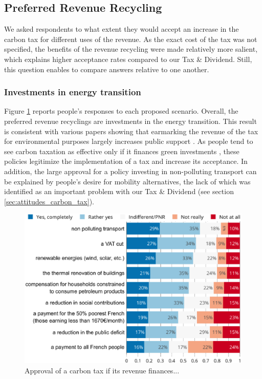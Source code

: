 \documentclass[english,5p,authoryear]{elsarticle}
\begin{document}
    \subsection{Preferred Revenue Recycling}

%
We asked respondents to what extent they would accept an increase in the carbon tax for different uses of the revenue. As the exact cost of the tax was not specified, the benefits of the revenue recycling were made relatively more salient, which explains higher acceptance rates compared to our Tax \& Dividend. Still, this question enables to compare answers relative to one another.

        \subsubsection{Investments in energy transition}

%
%
%
Figure \ref{fig:recycling} reports people's responses to each proposed scenario. Overall, the preferred revenue recyclings are investments in the energy transition. This result is consistent with various papers showing that earmarking the revenue of the tax for environmental purposes largely increases public support \citep[for a review of the literature, see for instance][]{kallbekken_aasen_2010,carattini_overcoming_2018}. As people tend to see carbon taxation as effective only if it finances green investments \citep{saelen_kallbekken_2011}, these policies legitimize the implementation of a tax and increase its acceptance. In addition, the large approval for a policy investing in non-polluting transport can be explained by people's desire for mobility alternatives, the lack of which was identified as an important problem with our Tax \& Dividend (see section \ref{sec:attitudes_carbon_tax}). %

%

%

\begin{figure}[!htbp]
\centering
\includegraphics[width=\columnwidth]{Images_EPS/tax_condition_valc.eps}
\caption{Approval of a carbon tax if its revenue finances...}
\label{fig:recycling}
\end{figure}
\end{document}
